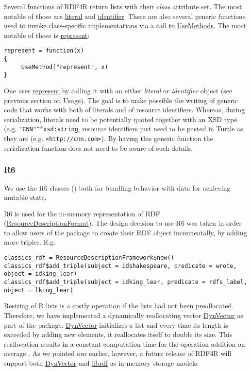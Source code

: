 Several functions of RDF4R return lists with their \emph{class} attribute set. The most notable of those are \url{literal} and \url{identifier}. There are also several generic functions used to invoke class-specific implementations via a call to \url{UseMethods}. The most notable of those is \url{represent}:

\begin{lstlisting}[style=customr]
represent = function(x)
{
     UseMethod("represent", x)
}
\end{lstlisting}

One uses \url{represent} by calling it with an either \emph{literal} or \emph{identifier} object (see previous section on Usage). The goal is to make possible the writing of generic code that works with both of literals and of resource identifiers. Whereas, during serialization, literals need to be potentially quoted together with an XSD type (e.g. {\tt "CNN"\textasciicircum\textasciicircum xsd:string}, resource identifiers just need to be pasted in Turtle as they are (e.g. {\tt <http://cnn.com>}). By having this generic function the serialization function does not need to be aware of such details.

\subsubsection{R6}

We use the R6 classes (\cite{chang_r6:_2017}) both for bundling behavior with data for achieving mutable state.

R6 is used for the in-memory representation of RDF (\url{ResourceDescriptionFormat}). The design decision to use R6 was taken in order to allow users of the package to create their RDF object incrementally, by adding more triples. E.g.

\begin{lstlisting}[style=customr]
classics_rdf = ResourceDescriptionFramework$new()
classics_rdf$add_triple(subject = idshakespeare, predicate = wrote, object = idking_lear)
classics_rdf$add_triple(subject = idking_lear, predicate = rdfs_label, object = lking_lear)
\end{lstlisting}

Resizing of R lists is a costly operation if the lists had not been preallocated. Therefore, we have implemented a dynamically reallocating vector \url{DynVector} as part of the package. \url{DynVector} initializes a list and every time its length is exceeded by adding new elements, it reallocates itself to double its size. This reallocation results in a constant computation time for the operation addition on average \cite{harrington_amortizing_2018}. As we pointed our earlier, however, a future release of RDF4R will support both \url{DynVector} and \url{librdf} as in-memory storage models.

